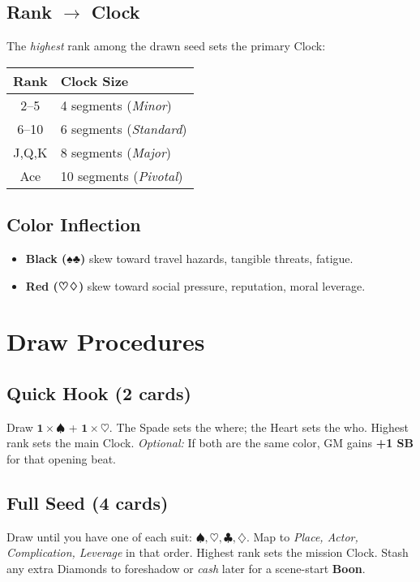 \begin{multicols}{2}
\subsection*{Rank \(\rightarrow\) Clock}
The \emph{highest} rank among the drawn seed sets the primary Clock:
\begin{center}
\begin{tabular}{cl}
\toprule
\textbf{Rank} & \textbf{Clock Size} \\
\midrule
2–5 & 4 segments (\emph{Minor}) \\
6–10 & 6 segments (\emph{Standard}) \\
J,Q,K & 8 segments (\emph{Major}) \\
Ace & 10 segments (\emph{Pivotal}) \\
\bottomrule
\end{tabular}
\end{center}

\subsection*{Color Inflection}
\begin{itemize}
  \item \textbf{Black (♠♣)} skew toward travel hazards, tangible threats, fatigue.
  \item \textbf{Red (♡♢)} skew toward social pressure, reputation, moral leverage.
\end{itemize}

\section{Draw Procedures}

\subsection*{Quick Hook (2 cards)}
Draw \(\mathbf{1\times♠}\) + \(\mathbf{1\times♡}\).\; The Spade sets the where; the Heart sets the who. Highest rank sets the main Clock. \emph{Optional:} If both are the same color, GM gains \textbf{+1 SB} for that opening beat. 

\subsection*{Full Seed (4 cards)}
Draw until you have one of each suit: \(\spadesuit,\heartsuit,\clubsuit,\diamondsuit\).\; Map to \emph{Place, Actor, Complication, Leverage} in that order. Highest rank sets the mission Clock. Stash any extra Diamonds to foreshadow or \emph{cash} later for a scene-start \textbf{Boon}. 


\end{multicols}
